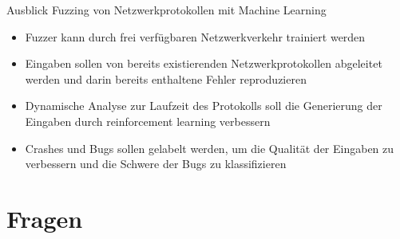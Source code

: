 \begin{frame}{Ausblick}
    \alert{Fuzzing von Netzwerkprotokollen mit Machine Learning}
    \begin{itemize}
        \item Fuzzer kann durch frei verfügbaren Netzwerkverkehr trainiert werden
        \item Eingaben sollen von bereits existierenden Netzwerkprotokollen abgeleitet werden und darin bereits
        enthaltene Fehler reproduzieren
        \item Dynamische Analyse zur Laufzeit des Protokolls soll die Generierung der Eingaben durch reinforcement learning verbessern
        \item Crashes und Bugs sollen gelabelt werden, um die Qualität der Eingaben zu verbessern
        und die Schwere der Bugs zu klassifizieren
    \end{itemize}
\end{frame}
\section{Fragen}\label{sec:fragen}